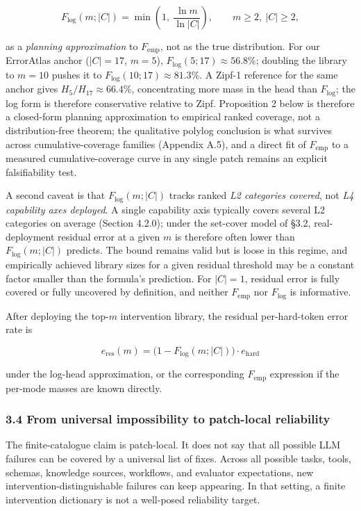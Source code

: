 \documentclass[
]{article}
\begin{document}
\[
F_{\log}(m; |C|) = \min\!\left(1,\ \frac{\ln m}{\ln |C|}\right), \qquad m \geq 2,\ |C| \geq 2,
\]

as a \emph{planning approximation} to \(F_{\text{emp}}\), not as the
true distribution. For our ErrorAtlas anchor (\(|C| = 17\), \(m = 5\)),
\(F_{\log}(5; 17) \approx 56.8\%\); doubling the library to \(m = 10\)
pushes it to \(F_{\log}(10; 17) \approx 81.3\%\). A Zipf-1 reference for
the same anchor gives \(H_5 / H_{17} \approx 66.4\%\), concentrating
more mass in the head than \(F_{\log}\); the log form is therefore
conservative relative to Zipf. Proposition 2 below is therefore a
closed-form planning approximation to empirical ranked coverage, not a
distribution-free theorem; the qualitative polylog conclusion is what
survives across cumulative-coverage families (Appendix A.5), and a
direct fit of \(F_{\text{emp}}\) to a measured cumulative-coverage curve
in any single patch remains an explicit falsifiability test.

A second caveat is that \(F_{\log}(m; |C|)\) tracks ranked \emph{L2
categories covered}, not \emph{L4 capability axes deployed}. A single
capability axis typically covers several L2 categories on average
(Section 4.2.0); under the set-cover model of §3.2, real-deployment
residual error at a given \(m\) is therefore often lower than
\(F_{\log}(m; |C|)\) predicts. The bound remains valid but is loose in
this regime, and empirically achieved library sizes for a given residual
threshold may be a constant factor smaller than the formula's
prediction. For \(|C| = 1\), residual error is fully covered or fully
uncovered by definition, and neither \(F_{\text{emp}}\) nor \(F_{\log}\)
is informative.

After deploying the top-\(m\) intervention library, the residual
per-hard-token error rate is

\[
e_{\text{res}}(m) = \bigl(1 - F_{\log}(m; |C|)\bigr) \cdot e_{\text{hard}}
\]

under the log-head approximation, or the corresponding
\(F_{\text{emp}}\) expression if the per-mode masses are known directly.

\subsubsection{3.4 From universal impossibility to patch-local
reliability}\label{from-universal-impossibility-to-patch-local-reliability}

The finite-catalogue claim is patch-local. It does not say that all
possible LLM failures can be covered by a universal list of fixes.
Across all possible tasks, tools, schemas, knowledge sources, workflows,
and evaluator expectations, new intervention-distinguishable failures
can keep appearing. In that setting, a finite intervention dictionary is
not a well-posed reliability target.
\end{document}
